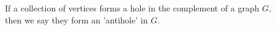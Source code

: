 \documentclass[preview]{standalone}
\begin{document}
\begin{center}
If a collection of vertices forms a hole in the complement of a graph $G$,\\then we say they form an 'antihole' in $G$.
\end{center}
\end{document}
